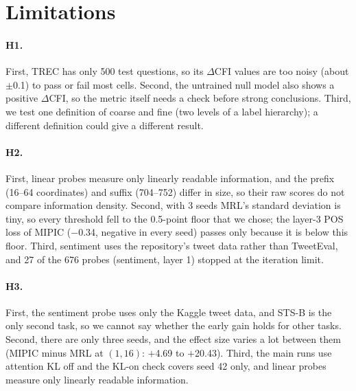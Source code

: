 \section*{Limitations}

\paragraph{H1.}
First, TREC has only 500 test questions, so its $\Delta$CFI values are too noisy (about $\pm$0.1) to pass or fail most cells.
Second, the untrained null model also shows a positive $\Delta$CFI, so the metric itself needs a check before strong conclusions.
Third, we test one definition of coarse and fine (two levels of a label hierarchy); a different definition could give a different result.

\paragraph{H2.}
First, linear probes measure only linearly readable information, and the prefix (16--64 coordinates) and suffix (704--752) differ in size, so their raw scores do not compare information density.
Second, with 3 seeds MRL's standard deviation is tiny, so every threshold fell to the 0.5-point floor that we chose; the layer-3 POS loss of MIPIC ($-$0.34, negative in every seed) passes only because it is below this floor.
Third, sentiment uses the repository's tweet data rather than TweetEval, and 27 of the 676 probes (sentiment, layer 1) stopped at the iteration limit.

\paragraph{H3.}
First, the sentiment probe uses only the Kaggle tweet data, and STS-B is the only second task, so we cannot say whether the early gain holds for other tasks.
Second, there are only three seeds, and the effect size varies a lot between them (MIPIC minus MRL at $(1,16)$: $+$4.69 to $+$20.43).
Third, the main runs use attention KL off and the KL-on check covers seed 42 only, and linear probes measure only linearly readable information.

